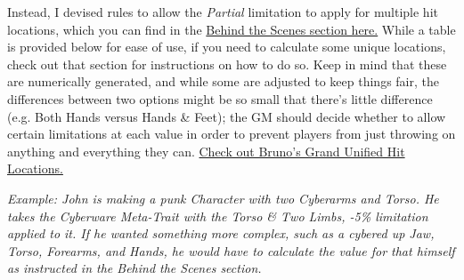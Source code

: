 \begin{multicols*}{3}
	Instead, I devised rules to allow the \textit{Partial} limitation to apply for multiple hit locations, which you can find in the \hyperref[partial]{Behind the Scenes section here.} While a table is provided below for ease of use, if you need to calculate some unique locations, check out that section for instructions on how to do so. Keep in mind that these are numerically generated, and while some are adjusted to keep things fair, the differences between two options might be so small that there's little difference (e.g. Both Hands versus Hands \& Feet); the GM should decide whether to allow certain limitations at each value in order to prevent players from just throwing on anything and everything they can. \textcolor{Blue}{\href{https://drive.google.com/file/d/0B9vo3aBTs2W7UExsUEZGNjdJejg/view?resourcekey=0-pGjkVxQLp-67-iHB73z1dQ}{Check out Bruno's Grand Unified Hit Locations.}}
	
	\textcolor{OliveGreen}{\textit{Example: John is making a punk Character with two Cyberarms and Torso. He takes the Cyberware Meta-Trait with the \textit{Torso \& Two Limbs, -5\%} limitation applied to it. If he wanted something more complex, such as a cybered up Jaw, Torso, Forearms, and Hands, he would have to calculate the value for that himself as instructed in the Behind the Scenes section.}}
	

\end{multicols*}
